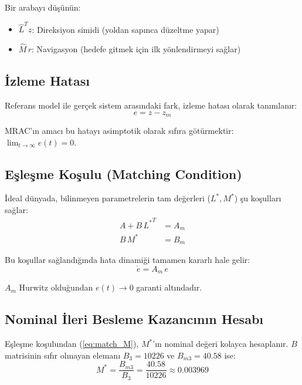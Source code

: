 \documentclass[12pt,a4paper]{article}
\begin{document}
\begin{kavram}
Bir arabayı düşünün:
\begin{itemize}
    \item $\hat{L}^T z$: Direksiyon simidi (yoldan sapınca düzeltme yapar)
    \item $\hat{M}\,r$: Navigasyon (hedefe gitmek için ilk yönlendirmeyi sağlar)
\end{itemize}
\end{kavram}

\subsection{İzleme Hatası}

Referans model ile gerçek sistem arasındaki fark, izleme hatası olarak tanımlanır:
\begin{equation}
    e = z - z_m
    \label{eq:error}
\end{equation}

MRAC'ın amacı bu hatayı asimptotik olarak sıfıra götürmektir: $\lim_{t\to\infty} e(t) = 0$.

\subsection{Eşleşme Koşulu (Matching Condition)}

İdeal dünyada, bilinmeyen parametrelerin tam değerleri ($L^*, M^*$) şu koşulları sağlar:
\begin{align}
    A + B\,{L^*}^T &= A_m \label{eq:match_L}\\
    B\,M^* &= B_m \label{eq:match_M}
\end{align}

Bu koşullar sağlandığında hata dinamiği tamamen kararlı hale gelir:
\begin{equation}
    \dot{e} = A_m\,e
\end{equation}

$A_m$ Hurwitz olduğundan $e(t) \to 0$ garanti altındadır.

\subsection{Nominal İleri Besleme Kazancının Hesabı}
\label{subsec:M_nominal}

Eşleşme koşulundan (\ref{eq:match_M}), $M^*$'ın nominal değeri kolayca hesaplanır. $B$ matrisinin sıfır olmayan elemanı $B_3 = 10226$ ve $B_{m3} = 40.58$ ise:
\begin{equation}
    M^* = \frac{B_{m3}}{B_3} = \frac{40.58}{10226} \approx 0.003969
\end{equation}
\end{document}
